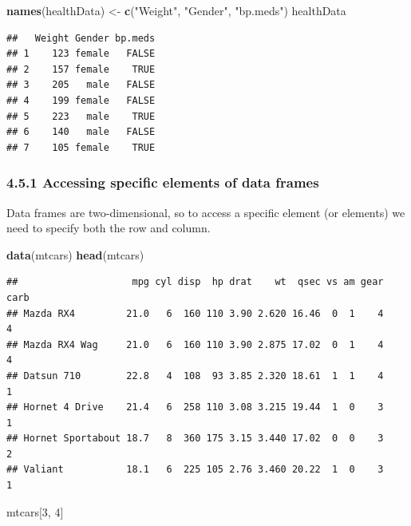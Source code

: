 \documentclass[]{article}
\newenvironment{Shaded}{\begin{snugshade}}{\end{snugshade}}
\newcommand{\KeywordTok}[1]{\textcolor[rgb]{0.13,0.29,0.53}{\textbf{#1}}}
\newcommand{\DecValTok}[1]{\textcolor[rgb]{0.00,0.00,0.81}{#1}}
\newcommand{\StringTok}[1]{\textcolor[rgb]{0.31,0.60,0.02}{#1}}
\newcommand{\NormalTok}[1]{#1}
\begin{document}
\begin{Shaded}
\begin{Highlighting}[]
\KeywordTok{names}\NormalTok{(healthData) <-}\StringTok{ }\KeywordTok{c}\NormalTok{(}\StringTok{"Weight"}\NormalTok{, }\StringTok{"Gender"}\NormalTok{, }\StringTok{"bp.meds"}\NormalTok{)}
\NormalTok{healthData}
\end{Highlighting}
\end{Shaded}

\begin{verbatim}
##   Weight Gender bp.meds
## 1    123 female   FALSE
## 2    157 female    TRUE
## 3    205   male   FALSE
## 4    199 female   FALSE
## 5    223   male    TRUE
## 6    140   male   FALSE
## 7    105 female    TRUE
\end{verbatim}

\subsubsection{4.5.1 Accessing specific elements of data
frames}\label{accessing-specific-elements-of-data-frames}

Data frames are two-dimensional, so to access a specific element (or
elements) we need to specify both the row and column.

\begin{Shaded}
\begin{Highlighting}[]
\KeywordTok{data}\NormalTok{(mtcars)}
\KeywordTok{head}\NormalTok{(mtcars)}
\end{Highlighting}
\end{Shaded}

\begin{verbatim}
##                    mpg cyl disp  hp drat    wt  qsec vs am gear carb
## Mazda RX4         21.0   6  160 110 3.90 2.620 16.46  0  1    4    4
## Mazda RX4 Wag     21.0   6  160 110 3.90 2.875 17.02  0  1    4    4
## Datsun 710        22.8   4  108  93 3.85 2.320 18.61  1  1    4    1
## Hornet 4 Drive    21.4   6  258 110 3.08 3.215 19.44  1  0    3    1
## Hornet Sportabout 18.7   8  360 175 3.15 3.440 17.02  0  0    3    2
## Valiant           18.1   6  225 105 2.76 3.460 20.22  1  0    3    1
\end{verbatim}

\begin{Shaded}
\begin{Highlighting}[]
\NormalTok{mtcars[}\DecValTok{3}\NormalTok{, }\DecValTok{4}\NormalTok{]}
\end{Highlighting}
\end{Shaded}
\end{document}
